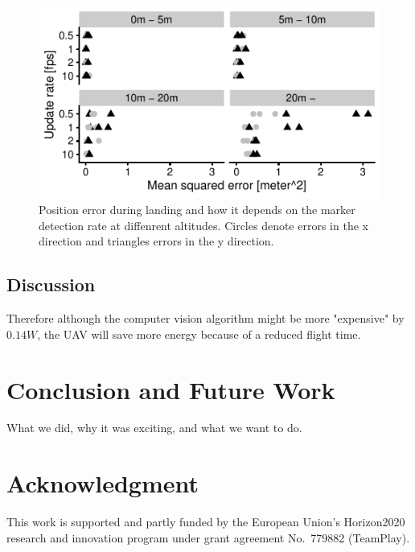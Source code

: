 \documentclass[conference]{IEEEtran}
\begin{document}
\begin{figure}[h]
\centering
\includegraphics{data_visualization/QoSLanding.pdf}
\caption{Position error during landing and how it depends 
on the marker detection rate at diffenrent altitudes.
Circles denote errors in the x direction and triangles 
errors in the y direction.}
\label{fig:PositionErrorDuringLanding}
\end{figure}



\subsection{Discussion}


Therefore although the computer vision algorithm might be more "expensive" by $0.14W$, the UAV will save more energy because of a reduced flight time. 

\section{Conclusion and Future Work}
\label{sec:conclusion}

What we did, why it was exciting, and what we want to do.

\section*{Acknowledgment}

This work is supported and partly funded by the European Union’s
Horizon2020 research and innovation program under grant agreement
No.~779882 (TeamPlay).


 
\vspace{1ex}
\end{document}
